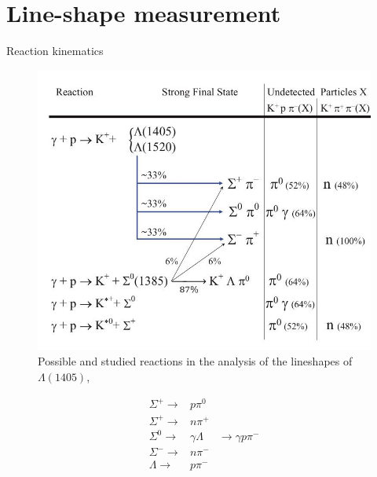 \documentclass[11pt,aspectratio=1610,dvipsnames]{beamer}
\begin{document}
\section{Line-shape measurement}


\begin{frame}{Reaction kinematics}
	\begin{minipage}{.63\linewidth}
		\begin{figure}[H]
			\includegraphics[width=\linewidth]{kinematics}
			\caption*{Possible and studied reactions in the analysis of the lineshapes of $\Lambda(1405)$,  \citet{lineshapes}}
		\end{figure}	
	\end{minipage}
	\begin{minipage}{.34\linewidth}
		\begin{align*}
			\Sigma^+\to &p \pi^0\\
			\Sigma^+\to &n \pi^+\\
			\Sigma^0\to &\gamma\Lambda&\to\gamma p \pi^-\\
			\Sigma^-\to &n \pi^-\\
			\Lambda\to &p \pi^-\\
		\end{align*}
	\end{minipage}
	
\end{frame}
\end{document}
